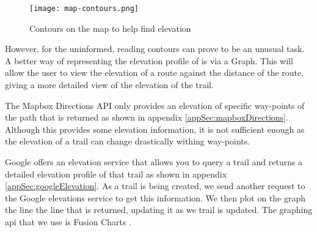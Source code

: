 \begin{figure}[htb!]
    \centering
    \texttt{[image: map-contours.png]}
    \caption{Contours on the map to help find elevation}
    \label{fig:MapContours}
\end{figure}


However, for the uninformed, reading contours can prove to be an unusual task. A better way of representing the elevation profile of is via a Graph. This will allow the user to view the elevation of a route against the distance of the route, giving a more detailed view of the elevation of the trail.

The Mapbox Directions API only provides an elevation of specific way-points of the path that is returned as shown in appendix \ref{appSec:mapboxDirections}. Although this provides some elevation information, it is not sufficient enough as the elevation of a trail can change drastically withing way-points.

Google offers an elevation service that allows you to query a trail and returns a detailed elevation profile of that trail as shown in appendix \ref{appSec:googleElevation}. As a trail is being created, we send another request to the Google elevations service to get this information. We then plot on the graph the line the line that is returned, updating it as we trail is updated. The graphing \acrshort{api} that we use is Fusion Charts \cite{fusionCharts}.